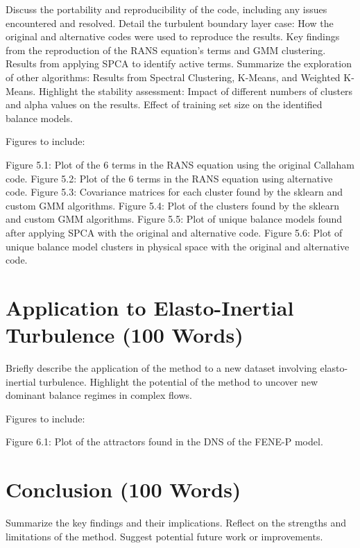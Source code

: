 \documentclass[12pt]{report} %
\begin{document}
Discuss the portability and reproducibility of the code, including any issues encountered and resolved.
Detail the turbulent boundary layer case:
How the original and alternative codes were used to reproduce the results.
Key findings from the reproduction of the RANS equation’s terms and GMM clustering.
Results from applying SPCA to identify active terms.
Summarize the exploration of other algorithms:
Results from Spectral Clustering, K-Means, and Weighted K-Means.
Highlight the stability assessment:
Impact of different numbers of clusters and alpha values on the results.
Effect of training set size on the identified balance models.

Figures to include:

Figure 5.1: Plot of the 6 terms in the RANS equation using the original Callaham code.
Figure 5.2: Plot of the 6 terms in the RANS equation using alternative code.
Figure 5.3: Covariance matrices for each cluster found by the sklearn and custom GMM algorithms.
Figure 5.4: Plot of the clusters found by the sklearn and custom GMM algorithms.
Figure 5.5: Plot of unique balance models found after applying SPCA with the original and alternative code.
Figure 5.6: Plot of unique balance model clusters in physical space with the original and alternative code.


\chapter{Application to Elasto-Inertial Turbulence (100 Words)}

Briefly describe the application of the method to a new dataset involving elasto-inertial turbulence.
Highlight the potential of the method to uncover new dominant balance regimes in complex flows.

Figures to include:

Figure 6.1: Plot of the attractors found in the DNS of the FENE-P model.

\chapter{Conclusion (100 Words)}

Summarize the key findings and their implications.
Reflect on the strengths and limitations of the method.
Suggest potential future work or improvements.
\end{document}
